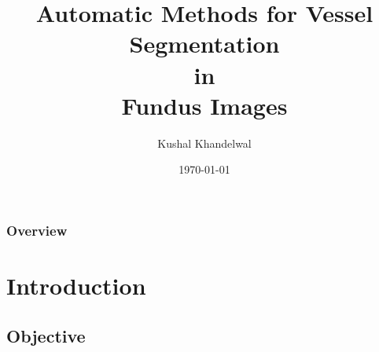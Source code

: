 \documentclass{beamer}
\title[Vessel Segmentation Methods]{Automatic Methods for Vessel Segmentation\\ in \\Fundus Images} %
\author{Kushal Khandelwal} %
\institute[HCI] %
{
	Heidelberg Collaboratory for Image Processing \\ %
	\medskip
	\textit{kushal.khandelwal@iwr.uni-heidelberg.de} %
}
\date{\today} %
\begin{document}
	
	\begin{frame}
		\titlepage %
	\end{frame}
	
	\begin{frame}
		\frametitle{Overview} %
		\tableofcontents %
	\end{frame}
	
	
	\section{Introduction} %
	
	\subsection{Objective} %
	
\end{document}
